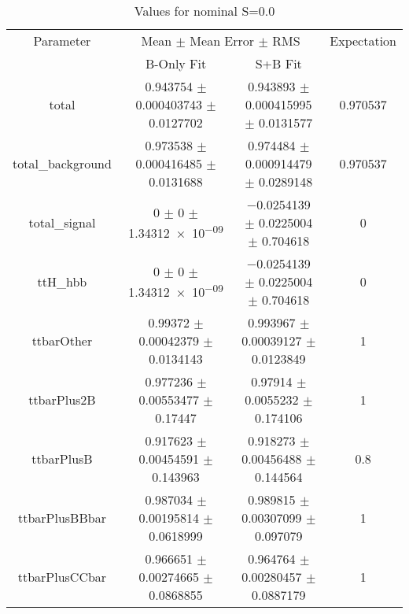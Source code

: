 \begin{table}
\centering
\caption{Values for nominal S=0.0}
\begin{tabular}{cccc}
\toprule
Parameter & \multicolumn{2}{c}{Mean $\pm$ Mean Error $\pm$ RMS} & Expectation\\
 & B-Only Fit & S+B Fit & \\
\midrule
total & \num{0.943754} $\pm$ \num{0.000403743} $\pm$ \num{0.0127702} & \num{0.943893} $\pm$ \num{0.000415995} $\pm$ \num{0.0131577} & \num{0.970537}\\
total\_background & \num{0.973538} $\pm$ \num{0.000416485} $\pm$ \num{0.0131688} & \num{0.974484} $\pm$ \num{0.000914479} $\pm$ \num{0.0289148} & \num{0.970537}\\
total\_signal & \num{0} $\pm$ \num{0} $\pm$ \num{1.34312e-09} & \num{-0.0254139} $\pm$ \num{0.0225004} $\pm$ \num{0.704618} & \num{0}\\
ttH\_hbb & \num{0} $\pm$ \num{0} $\pm$ \num{1.34312e-09} & \num{-0.0254139} $\pm$ \num{0.0225004} $\pm$ \num{0.704618} & \num{0}\\
ttbarOther & \num{0.99372} $\pm$ \num{0.00042379} $\pm$ \num{0.0134143} & \num{0.993967} $\pm$ \num{0.00039127} $\pm$ \num{0.0123849} & \num{1}\\
ttbarPlus2B & \num{0.977236} $\pm$ \num{0.00553477} $\pm$ \num{0.17447} & \num{0.97914} $\pm$ \num{0.0055232} $\pm$ \num{0.174106} & \num{1}\\
ttbarPlusB & \num{0.917623} $\pm$ \num{0.00454591} $\pm$ \num{0.143963} & \num{0.918273} $\pm$ \num{0.00456488} $\pm$ \num{0.144564} & \num{0.8}\\
ttbarPlusBBbar & \num{0.987034} $\pm$ \num{0.00195814} $\pm$ \num{0.0618999} & \num{0.989815} $\pm$ \num{0.00307099} $\pm$ \num{0.097079} & \num{1}\\
ttbarPlusCCbar & \num{0.966651} $\pm$ \num{0.00274665} $\pm$ \num{0.0868855} & \num{0.964764} $\pm$ \num{0.00280457} $\pm$ \num{0.0887179} & \num{1}\\
\bottomrule
\end{tabular}
\end{table}